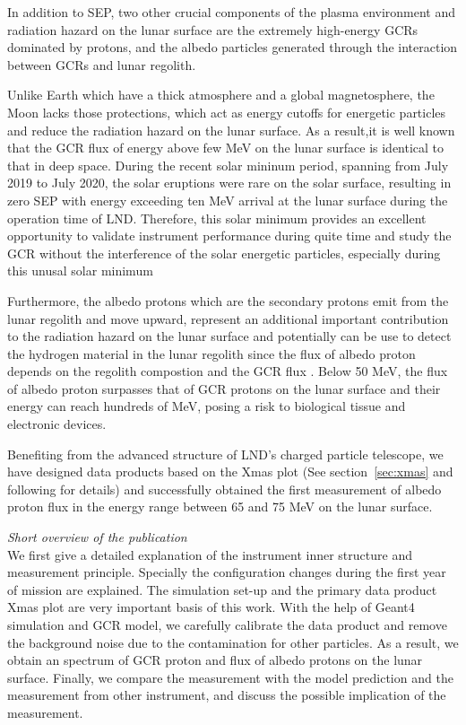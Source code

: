 
In addition to \acs{SEP}, two other crucial components of the plasma environment and radiation hazard on the lunar surface are the extremely high-energy \acp{GCR} dominated by protons, and the albedo particles generated through the interaction between \acp{GCR} and lunar regolith.

Unlike Earth which have a thick atmosphere and a global magnetosphere, the Moon lacks those protections, which act as energy cutoffs for energetic particles and reduce the radiation hazard on the lunar surface. As a result,it is well known that the \ac{GCR} flux of energy above few MeV on the lunar surface is identical to that in deep space.
During the recent solar mininum period, spanning from July 2019 to July 2020, the solar eruptions were rare on the solar surface, resulting in zero \ac{SEP} with energy exceeding ten MeV arrival at the lunar surface during the operation time of \ac{LND}.
Therefore, this solar minimum provides an excellent opportunity to validate instrument performance during quite time and study the \acs{GCR} without the interference of the solar energetic particles, especially during this unusal solar minimum \citep{Strauss2023ApJ, Fu2021ApJS}

Furthermore, the albedo protons which are the secondary protons emit from the lunar regolith and move upward, represent an additional important contribution to the radiation hazard on the lunar surface and potentially can be use to detect the hydrogen material in the lunar regolith since the flux of albedo proton depends on the regolith compostion and the \ac{GCR} flux \citep{Schwadron2016Icarus}.
Below 50 MeV, the flux of albedo proton surpasses that of GCR protons on the lunar surface \citep{Dobynde2021JGRE, Wimmer2020SSRv} and their energy can reach hundreds of MeV, posing a risk to biological tissue and electronic devices.

Benefiting from the advanced structure of \ac{LND}'s charged particle telescope, we have designed data products based on the Xmas plot (See section~\ref{sec:xmas} and following for details) and successfully obtained the first measurement of albedo proton flux in the energy range between 65 and 75 MeV on the lunar surface.


\textit{Short overview of the publication}\\

We first give a detailed explanation of the instrument inner structure and measurement principle. Specially the configuration changes during the first year of mission are explained. The simulation set-up and the primary data product Xmas plot are very important basis of this work.
With the help of \ac{Geant4} simulation and \ac{GCR} model, we carefully calibrate the data product and remove the background noise due to the contamination for other particles. As a result, we obtain an spectrum of \ac{GCR} proton and flux of albedo protons on the lunar surface. Finally, we compare the measurement with the model prediction and the measurement from other instrument, and discuss the possible implication of the measurement.


